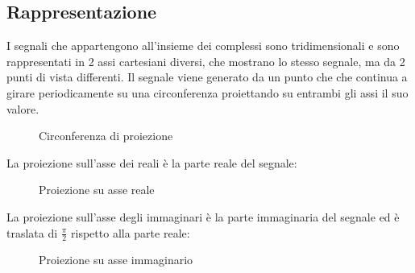 \documentclass[a4paper]{article}
\begin{document}
\subsection{Rappresentazione}
I segnali che appartengono all'insieme dei complessi sono tridimensionali e sono
rappresentati in 2 assi cartesiani diversi, che mostrano lo stesso segnale, ma
da 2 punti di vista differenti. Il segnale viene generato da un punto che  
che continua a girare periodicamente su una circonferenza proiettando su entrambi
gli assi il suo valore.
\begin{figure}[H]
  \centering
  \caption{Circonferenza di proiezione}
\end{figure}

La proiezione sull'asse dei reali è la parte reale del segnale:
\begin{figure}[H]
  \centering
  \caption{Proiezione su asse reale}
\end{figure}

La proiezione sull'asse degli immaginari è la parte immaginaria del segnale ed è
traslata di \( \frac{\pi}{2} \) rispetto alla parte reale:
\begin{figure}[H]
  \centering
  \caption{Proiezione su asse immaginario}
\end{figure}
\end{document}

